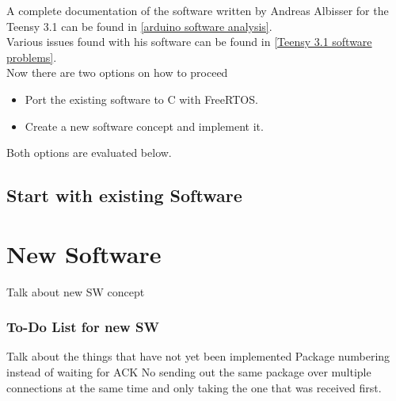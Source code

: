 %
A complete documentation of the software written by Andreas Albisser for the Teensy 3.1 can be found in \ref{arduino software analysis}.\\
Various issues found with his software can be found in \ref{Teensy 3.1 software problems}.\\
Now there are two options on how to proceed
\begin{itemize}
    \item Port the existing software to C with FreeRTOS.
    \item Create a new software concept and implement it.
\end{itemize}
Both options are evaluated below.\\
\subsection{Start with existing Software}

%
\section{New Software}%
%
Talk about new SW concept
%
\subsubsection{To-Do List for new SW}%
%
Talk about the things that have not yet been implemented
Package numbering instead of waiting for ACK
No sending out the same package over multiple connections at the same time and only taking the one that was received first.